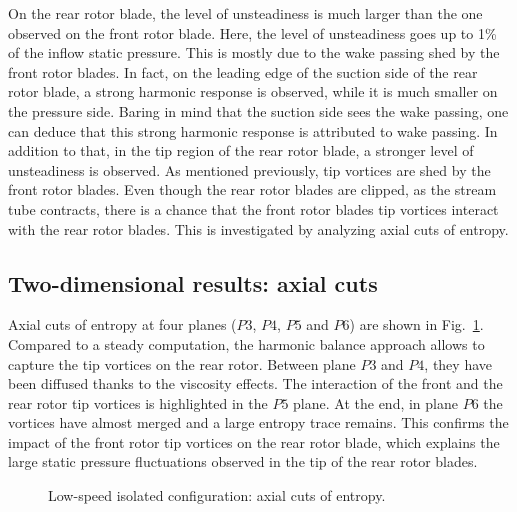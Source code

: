 On the rear rotor blade, the level
of unsteadiness is much larger than the one observed on
the front rotor blade. 
Here, the level of unsteadiness
goes up to 1\% of the inflow static pressure.
This is mostly due to the wake passing
shed by the front rotor blades. In fact, on the leading
edge of the suction side of the rear rotor blade, 
a strong harmonic response is observed, while it is 
much smaller on the pressure side. Baring in mind that 
the suction side sees the wake passing, one can deduce
that this strong harmonic response is attributed to wake passing.
In addition to that, in the tip region of the rear rotor blade, 
a stronger level of unsteadiness is observed. As mentioned
previously, tip vortices are shed by the front rotor blades.
Even though the rear rotor blades are clipped, as 
the stream tube contracts, there is a chance that
the front rotor blades tip vortices interact with the 
rear rotor blades. This is investigated by analyzing
axial cuts of entropy.

\subsection{Two-dimensional results: axial cuts}
\label{sub:dream_ls_hb_axial_cuts}

Axial cuts of entropy at four planes ($P3$, $P4$, $P5$ and $P6$)
are shown in Fig.~\ref{fig:dream_ls_hb_axial_cut_entropy}.
Compared to a steady computation, the harmonic balance
approach allows to capture the
tip vortices on the rear rotor. Between plane $P3$
and $P4$, they have been diffused thanks to the viscosity effects.
The interaction of the front and the rear rotor tip vortices
is highlighted in the $P5$ plane. At the end, in plane $P6$
the vortices have almost merged and a large entropy
trace remains. This confirms the impact
of the front rotor tip vortices on the
rear rotor blade, which explains the large static pressure
fluctuations observed in the tip of the rear 
rotor blades.
\begin{figure}[htp]
  \centering
  \caption{Low-speed isolated configuration: axial cuts of entropy.}
   \label{fig:dream_ls_hb_axial_cut_entropy}
\end{figure}

